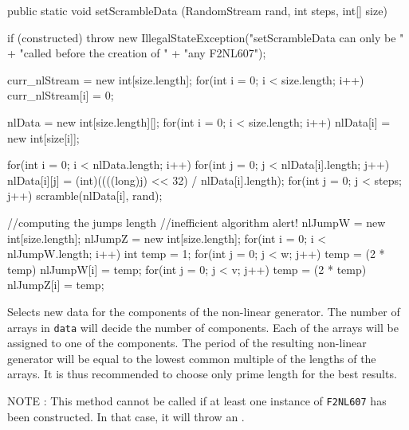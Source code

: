 \begin{code}

   public static void setScrambleData (RandomStream rand, int steps,
                                       int[] size) \begin{hide} {
      if (constructed)
         throw new IllegalStateException("setScrambleData can only be " +
                                         "called before the creation of " +
                                         "any F2NL607");

      curr_nlStream = new int[size.length];
      for(int i = 0; i < size.length; i++)
         curr_nlStream[i] = 0;

      nlData = new int[size.length][];
      for(int i = 0; i < size.length; i++)
         nlData[i] = new int[size[i]];

      for(int i = 0; i < nlData.length; i++) {
         for(int j = 0; j < nlData[i].length; j++)
            nlData[i][j] = (int)((((long)j) << 32) / nlData[i].length);
         for(int j = 0; j < steps; j++)
            scramble(nlData[i], rand);
      }

      //computing the jumps length
      //inefficient algorithm alert!
      nlJumpW = new int[size.length];
      nlJumpZ = new int[size.length];
      for(int i = 0; i < nlJumpW.length; i++) {
         int temp = 1;
         for(int j = 0; j < w; j++)
            temp = (2 * temp) %
         nlJumpW[i] = temp;
         for(int j = 0; j < v; j++)
            temp = (2 * temp) %
         nlJumpZ[i] = temp;
      }
   } \end{hide}
\end{code}
\begin{tabb} Selects new data for the components of the non-linear generator.
  The number of arrays in \texttt{data} will decide the number of components.
  Each of the arrays will be assigned to one of the components. The period
  of the resulting non-linear generator will be equal to the lowest common
  multiple of the lengths of the arrays. It is thus recommended to choose
  only prime length for the best results.

  NOTE : This method cannot be called if at least one instance of
  \texttt{F2NL607} has been constructed. In that case, it will throw
  an .
\end{tabb}
\begin{htmlonly}
\end{htmlonly}
